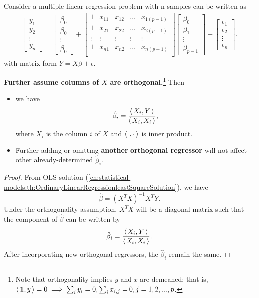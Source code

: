 \begin{refsection}
\begin{theorem}
Consider a multiple linear regression problem  with n samples can be written as
\begin{align*}
\begin{bmatrix}
y_1\\
y_2\\
\vdots\\
y_n
\end{bmatrix} = \begin{bmatrix}
\beta_0\\
\beta_0\\
\vdots\\
\beta_0
\end{bmatrix}+\begin{bmatrix}
1 & x_{11} & x_{12} & \dots & x_{1(p-1)}\\
1 & x_{21} & x_{22} & \dots & x_{2(p-1)}\\
\vdots & \vdots & \vdots & \vdots & \vdots \\
1 & x_{n1} & x_{n2} & \dots & x_{n(p-1)}\\
\end{bmatrix}
\begin{bmatrix}
\beta_0\\
\beta_1\\
\vdots\\
\beta_{p-1}
\end{bmatrix}
+ \begin{bmatrix}
\epsilon_1\\
\epsilon_2\\
\vdots\\
\epsilon_{n}
\end{bmatrix}.
\end{align*}
with matrix form
$Y = X\beta + \epsilon$.

\textbf{Further assume columns of $X$ are orthogonal.}\footnote{Note that orthogonality implies $y$ and $x$ are demeaned; that is, ${\left< \, \bm{1},y \, \right>} = 0\implies\sum_i y_i = 0, \sum_{i}x_{i,j} = 0, j=1,2,...,p$.} 
Then 
\begin{itemize}
	\item we have 
	$$\hat{\beta}_i = \frac{ {\left< \, X_i,Y \, \right>}}{{\left< \, X_i,X_i \, \right>}},$$
	where $X_i$ is the column $i$ of $X$ and ${\left< \, \cdot, \cdot \, \right>}$ is inner product.
	\item Further adding or omitting \textbf{another orthogonal regressor} will not affect other already-determined $\hat{\beta}_i$.
\end{itemize}
\end{theorem}
\begin{proof}
From OLS solution (\autoref{ch:statistical-models:th:OrdinaryLinearRegressionleastSquareSolution}), we have
$$\hat{\beta} = (X^TX)^{-1}X^TY.$$
Under the orthogonality assumption, $X^TX$ will be a diagonal matrix such that the component of $\hat{\beta}$ can be written by
$$\hat{\beta}_i = \frac{ {\left< \, X_i,Y \, \right>}}{{\left< \, X_i,X_i \, \right>}}.$$
After incorporating new orthogonal regressors, the $\hat{\beta}_i$ remain the same.


\end{proof}
\end{refsection}
